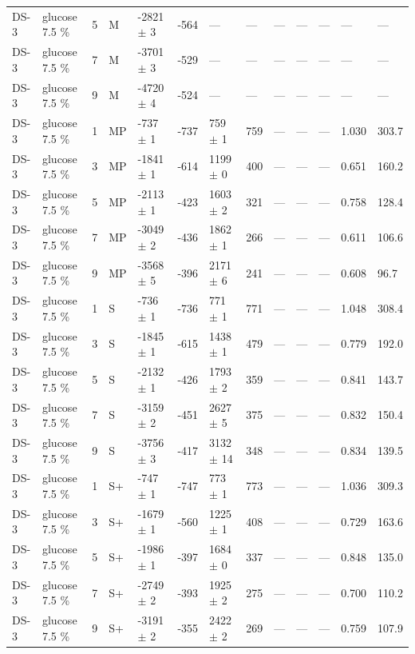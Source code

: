 \documentclass[11pt,a4paper]{article}
\begin{document}
\begin{landscape}
{\begin{longtable}{@{}lllllllllllll@{}}
DS-3 & glucose 7.5 \% & 5 & M & -2821 $\pm$ 3 & -564 & --- & --- & --- & --- & --- & --- & --- \\
DS-3 & glucose 7.5 \% & 7 & M & -3701 $\pm$ 3 & -529 & --- & --- & --- & --- & --- & --- & --- \\
DS-3 & glucose 7.5 \% & 9 & M & -4720 $\pm$ 4 & -524 & --- & --- & --- & --- & --- & --- & --- \\
DS-3 & glucose 7.5 \% & 1 & MP & -737 $\pm$ 1 & -737 & 759 $\pm$ 1 & 759 & --- & --- & --- & 1.030 & 303.7 \\
DS-3 & glucose 7.5 \% & 3 & MP & -1841 $\pm$ 1 & -614 & 1199 $\pm$ 0 & 400 & --- & --- & --- & 0.651 & 160.2 \\
DS-3 & glucose 7.5 \% & 5 & MP & -2113 $\pm$ 1 & -423 & 1603 $\pm$ 2 & 321 & --- & --- & --- & 0.758 & 128.4 \\
DS-3 & glucose 7.5 \% & 7 & MP & -3049 $\pm$ 2 & -436 & 1862 $\pm$ 1 & 266 & --- & --- & --- & 0.611 & 106.6 \\
DS-3 & glucose 7.5 \% & 9 & MP & -3568 $\pm$ 5 & -396 & 2171 $\pm$ 6 & 241 & --- & --- & --- & 0.608 & 96.7 \\
DS-3 & glucose 7.5 \% & 1 & S & -736 $\pm$ 1 & -736 & 771 $\pm$ 1 & 771 & --- & --- & --- & 1.048 & 308.4 \\
DS-3 & glucose 7.5 \% & 3 & S & -1845 $\pm$ 1 & -615 & 1438 $\pm$ 1 & 479 & --- & --- & --- & 0.779 & 192.0 \\
DS-3 & glucose 7.5 \% & 5 & S & -2132 $\pm$ 1 & -426 & 1793 $\pm$ 2 & 359 & --- & --- & --- & 0.841 & 143.7 \\
DS-3 & glucose 7.5 \% & 7 & S & -3159 $\pm$ 2 & -451 & 2627 $\pm$ 5 & 375 & --- & --- & --- & 0.832 & 150.4 \\
DS-3 & glucose 7.5 \% & 9 & S & -3756 $\pm$ 3 & -417 & 3132 $\pm$ 14 & 348 & --- & --- & --- & 0.834 & 139.5 \\
DS-3 & glucose 7.5 \% & 1 & S+ & -747 $\pm$ 1 & -747 & 773 $\pm$ 1 & 773 & --- & --- & --- & 1.036 & 309.3 \\
DS-3 & glucose 7.5 \% & 3 & S+ & -1679 $\pm$ 1 & -560 & 1225 $\pm$ 1 & 408 & --- & --- & --- & 0.729 & 163.6 \\
DS-3 & glucose 7.5 \% & 5 & S+ & -1986 $\pm$ 1 & -397 & 1684 $\pm$ 0 & 337 & --- & --- & --- & 0.848 & 135.0 \\
DS-3 & glucose 7.5 \% & 7 & S+ & -2749 $\pm$ 2 & -393 & 1925 $\pm$ 2 & 275 & --- & --- & --- & 0.700 & 110.2 \\
DS-3 & glucose 7.5 \% & 9 & S+ & -3191 $\pm$ 2 & -355 & 2422 $\pm$ 2 & 269 & --- & --- & --- & 0.759 & 107.9 \\

\end{longtable}}
\end{landscape}
\end{document}
